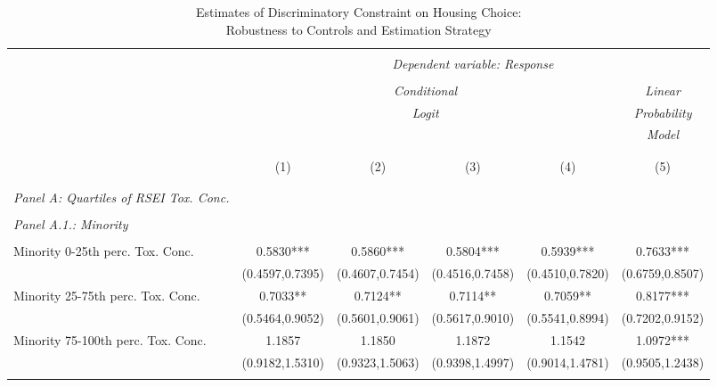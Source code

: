           \begin{table}[H] \tiny \centering \begin{threeparttable} \captionsetup{justification=centering}   \caption{Estimates of Discriminatory Constraint on Housing Choice: \\ Robustness to Controls and Estimation Strategy}         \label{tab:02mainresults} \begin{tabular}{@{\extracolsep{5pt}}lccccc} \\[-1.8ex]\hline \hline \\[-1.8ex]  & \multicolumn{5}{c}{\textit{Dependent variable: {\it Response}}} \\  \cline{2-6} \\ & \multicolumn{4}{c}{\textit{Conditional }} & {\it Linear} \\   & \multicolumn{4}{c}{\textit{ Logit}} & {\it Probability}\\ & \multicolumn{4}{c}{\textit{ }}  & {\it Model}\\ \cline{2-5} \\ \\[-1.8ex]  & (1) & (2) & (3) & (4)  & (5) \\  \\[-1.8ex]  \hline \\[-1.8ex]  {\it Panel A: Quartiles of RSEI Tox. Conc.}\\  \hline \\[-1.8ex]        
{\it Panel A.1.: Minority } \\                                 &  &  &    \\
Minority 0-25th perc. Tox. Conc.&      0.5830***&      0.5860***&      0.5804***&      0.5939***&      0.7633***\\
                    &(0.4597,0.7395)   &(0.4607,0.7454)   &(0.4516,0.7458)   &(0.4510,0.7820)   &(0.6759,0.8507)   \\
Minority 25-75th perc. Tox. Conc.&      0.7033** &      0.7124** &      0.7114** &      0.7059** &      0.8177***\\
                    &(0.5464,0.9052)   &(0.5601,0.9061)   &(0.5617,0.9010)   &(0.5541,0.8994)   &(0.7202,0.9152)   \\
Minority 75-100th perc. Tox. Conc.&      1.1857   &      1.1850   &      1.1872   &      1.1542   &      1.0972***\\
                    &(0.9182,1.5310)   &(0.9323,1.5063)   &(0.9398,1.4997)   &(0.9014,1.4781)   &(0.9505,1.2438)   \\
       \hline \\[-1.8ex] 
         

\end{tabular}
\end{threeparttable}
\end{table}
